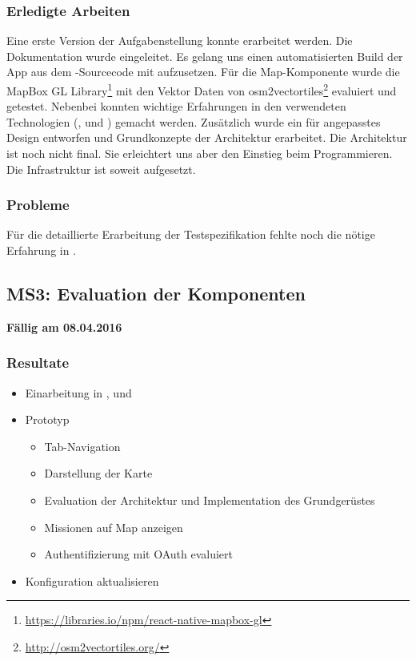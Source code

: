 \subsubsection{Erledigte Arbeiten}
Eine erste Version der Aufgabenstellung konnte erarbeitet werden. 
Die Dokumentation wurde eingeleitet.
Es gelang uns einen automatisierten Build der App aus dem -Sourcecode mit  aufzusetzen.
Für die Map-Komponente wurde die MapBox GL \gls{Library}\footnote{\url{https://libraries.io/npm/react-native-mapbox-gl}} mit den Vektor Daten von osm2vectortiles\footnote{\url{http://osm2vectortiles.org/}} evaluiert und getestet.
Nebenbei konnten wichtige Erfahrungen in den verwendeten Technologien (,  und ) gemacht werden.
Zusätzlich wurde ein für  angepasstes Design entworfen und Grundkonzepte der Architektur erarbeitet.
Die Architektur ist noch nicht final. 
Sie erleichtert uns aber den Einstieg beim Programmieren.
Die Infrastruktur ist soweit aufgesetzt.

\subsubsection{Probleme}
Für die detaillierte Erarbeitung der Testspezifikation fehlte noch die nötige Erfahrung in .


\subsection{MS3: Evaluation der Komponenten}
\label{pm-ms3}
\textbf{Fällig am 08.04.2016}
\subsubsection{Resultate}
\begin{itemize}
	\item Einarbeitung in ,  und 
	\item {} Prototyp
	\begin{itemize}
		\item Tab-Navigation
		\item Darstellung der Karte
		\item Evaluation der Architektur und Implementation des Grundgerüstes
		\item Missionen auf Map anzeigen
		\item Authentifizierung mit \gls{OAuth} evaluiert
	\end{itemize}
	\item {} Konfiguration aktualisieren
\end{itemize}


